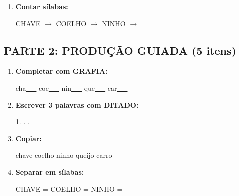 \begin{exercicio}
\begin{enumerate}
  \item \textbf{Contar sílabas:}
  \begin{center}
  CHAVE $\rightarrow$ \underline{\hspace{0.9cm}} \quad COELHO $\rightarrow$ \underline{\hspace{0.9cm}} \quad NINHO $\rightarrow$ \underline{\hspace{0.9cm}}
  \end{center}

\end{enumerate}

\subsection*{PARTE 2: PRODUÇÃO GUIADA (5 itens)}

\begin{enumerate}[resume]

  \item \textbf{Completar com GRAFIA:}
  \begin{center}
  cha\underline{~~~} \quad coe\underline{~~~} \quad nin\underline{~~~} \quad que\underline{~~~} \quad car\underline{~~~}
  \end{center}

  \item \textbf{Escrever 3 palavras com DITADO:}
  \begin{center}
  1. \underline{\hspace{3cm}} . \underline{\hspace{3cm}} . \underline{\hspace{3cm}}
  \end{center}

  \item \textbf{Copiar:}
  \begin{center}
  chave \quad coelho \quad ninho \quad queijo \quad carro
  \end{center}

  \item \textbf{Separar em sílabas:}
  \begin{center}
  CHAVE = \underline{\hspace{1cm}} \underline{\hspace{1cm}} \quad COELHO = \underline{\hspace{1cm}} \underline{\hspace{1cm}} \quad NINHO = \underline{\hspace{1cm}} \underline{\hspace{1cm}}
  \end{center}


\end{enumerate}
\end{exercicio}
